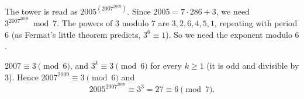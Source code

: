 The tower is read as $2005^{\left(2007^{2009}\right)}$. Since $2005=7\cdot286+3$, we need $3^{2007^{2009}}\bmod7$. The powers of $3$ modulo $7$ are $3,2,6,4,5,1$, repeating with period $6$ (as Fermat's little theorem predicts, $3^6\equiv1$). So we need the exponent modulo $6$.

$2007\equiv3\pmod6$, and $3^k\equiv3\pmod6$ for every $k\ge1$ (it is odd and divisible by $3$). Hence $2007^{2009}\equiv3\pmod6$ and
\[
2005^{2007^{2009}}\equiv3^3=27\equiv\boxed{6}\pmod7 .
\]
